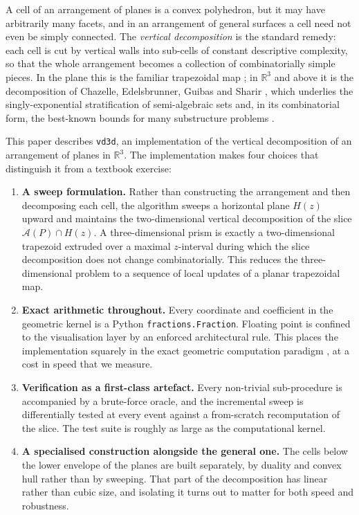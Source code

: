 \documentclass[11pt]{article}
\newcommand{\R}{\mathbb{R}}
\newcommand{\Arr}{\mathcal{A}}
\begin{document}
A cell of an arrangement of planes is a convex polyhedron, but it may have
arbitrarily many facets, and in an arrangement of general surfaces a cell need
not even be simply connected.  The \emph{vertical decomposition} is the
standard remedy: each cell is cut by vertical walls into sub-cells of constant
descriptive complexity, so that the whole arrangement becomes a collection of
combinatorially simple pieces.  In the plane this is the familiar trapezoidal
map \cite{seidel-trapezoid,mulmuley}; in $\R^3$ and above it is the
decomposition of Chazelle, Edelsbrunner, Guibas and Sharir
\cite{chazelle-stratification}, which underlies the singly-exponential
stratification of semi-algebraic sets and, in its combinatorial form, the
best-known bounds for many substructure problems
\cite{tagansky,deberg-guibas-halperin,guibas-halperin-matousek-sharir,koltun}.

This paper describes \texttt{vd3d}, an implementation of the vertical
decomposition of an arrangement of planes in $\R^3$.  The implementation makes
four choices that distinguish it from a textbook exercise:

\begin{enumerate}
\item \textbf{A sweep formulation.}  Rather than constructing the arrangement
  and then decomposing each cell, the algorithm sweeps a horizontal plane
  $H(z)$ upward and maintains the two-dimensional vertical decomposition of the
  slice $\Arr(P) \cap H(z)$.  A three-dimensional prism is exactly a
  two-dimensional trapezoid extruded over a maximal $z$-interval during which
  the slice decomposition does not change combinatorially.  This reduces the
  three-dimensional problem to a sequence of local updates of a planar
  trapezoidal map.
\item \textbf{Exact arithmetic throughout.}  Every coordinate and coefficient
  in the geometric kernel is a Python \texttt{fractions.Fraction}.  Floating
  point is confined to the visualisation layer by an enforced architectural
  rule.  This places the implementation squarely in the exact geometric
  computation paradigm \cite{yap-egc,kettner-classroom}, at a cost in speed
  that we measure.
\item \textbf{Verification as a first-class artefact.}  Every non-trivial
  sub-procedure is accompanied by a brute-force oracle, and the incremental
  sweep is differentially tested at every event against a from-scratch
  recomputation of the slice.  The test suite is roughly as large as the
  computational kernel.
\item \textbf{A specialised construction alongside the general one.}  The cells
  below the lower envelope of the planes are built separately, by duality and
  convex hull rather than by sweeping.  That part of the decomposition has
  linear rather than cubic size, and isolating it turns out to matter for both
  speed and robustness.
\end{enumerate}
\end{document}
